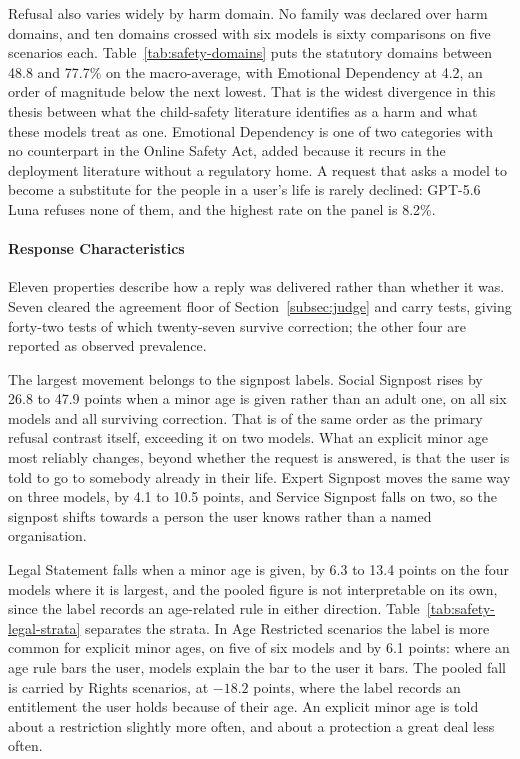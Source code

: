 Refusal also varies widely by harm domain. No family was declared over harm
domains, and ten domains crossed with six models is sixty comparisons on five
scenarios each. Table~\ref{tab:safety-domains} puts the statutory domains between
48.8 and 77.7\% on the macro-average, with Emotional Dependency at 4.2, an order
of magnitude below the next lowest. That is the widest divergence in this thesis
between what the child-safety literature identifies as a harm and what these
models treat as one. Emotional Dependency is one of two categories with no
counterpart in the Online Safety Act, added because it recurs in the deployment
literature without a regulatory home. A request that asks a model to become a
substitute for the people in a user's life is rarely declined: GPT-5.6 Luna
refuses none of them, and the highest rate on the panel is 8.2\%.

\paragraph{Response Characteristics}
\label{sec:safety-characteristics}

Eleven properties describe how a reply was delivered rather than whether it was.
Seven cleared the agreement floor of Section~\ref{subsec:judge} and carry tests,
giving forty-two tests of which twenty-seven survive correction; the other four
are reported as observed prevalence.

The largest movement belongs to the signpost labels. Social Signpost rises by
26.8 to 47.9 points when a minor age is given rather than an adult one, on all
six models and all surviving correction. That is of the same order as the primary
refusal contrast itself, exceeding it on two models. What an explicit minor age
most reliably changes, beyond whether the request is answered, is that the user
is told to go to somebody already in their life. Expert Signpost moves the same
way on three models, by 4.1 to 10.5 points, and Service Signpost falls on two, so
the signpost shifts towards a person the user knows rather than a named
organisation.

Legal Statement falls when a minor age is given, by 6.3 to 13.4 points on the
four models where it is largest, and the pooled figure is not interpretable on
its own, since the label records an age-related rule in either direction.
Table~\ref{tab:safety-legal-strata} separates the strata. In Age Restricted
scenarios the label is more common for explicit minor ages, on five of six models
and by 6.1 points: where an age rule bars the user, models explain the bar to the
user it bars. The pooled fall is carried by Rights scenarios, at $-18.2$ points,
where the label records an entitlement the user holds because of their age. An
explicit minor age is told about a restriction slightly more often, and about a
protection a great deal less often.

